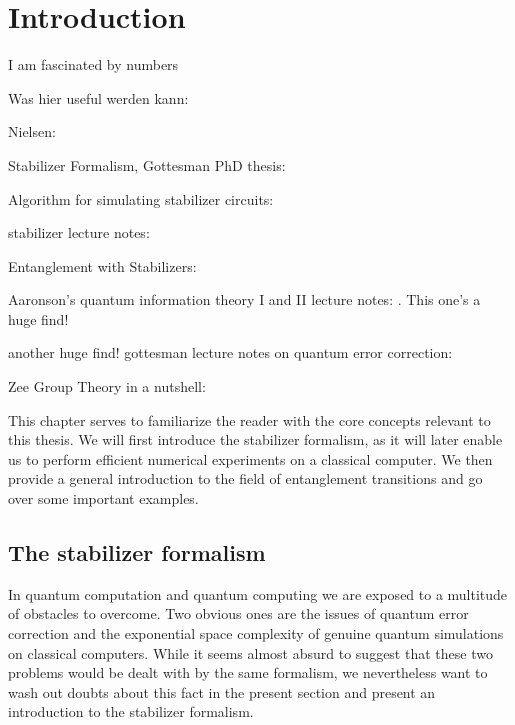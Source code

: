 \chapter{Introduction}
\label{ch:basics}
\epigraph{I am fascinated by numbers}{
\citeauthor{baron-cohenAutismSpectrumQuotientAQ2001}}

Was hier useful werden kann:

Nielsen: \cite{nielsenQuantumComputationQuantum2010}

Stabilizer Formalism, Gottesman PhD thesis: \cite{gottesmanStabilizerCodesQuantum1997}

Algorithm for simulating stabilizer circuits:
\cite{aaronsonImprovedSimulationStabilizer2004}

stabilizer lecture notes: \cite{arabLectureNotesQuantum2024}

Entanglement with Stabilizers: \cite{fattalEntanglementStabilizerFormalism2004}

Aaronson's quantum information theory I and II lecture notes:
\cite{aaronsonIntroductionQuantumInformation,aaronsonIntroductionQuantumInformationa}.
This one's a huge find!

another huge find! gottesman lecture notes on quantum error correction:
\cite{gottesmanSurvivingQuantumComputer2024}

Zee Group Theory in a nutshell: \cite{zeeGroupTheoryNutshell2016}

This chapter serves to familiarize the reader with the core concepts relevant
to this thesis. We will first introduce the stabilizer formalism, as it will
later enable us to perform efficient numerical experiments on a classical
computer. We then provide a general introduction to the field of entanglement
transitions and go over some important examples. 
\newpage
\section{The stabilizer formalism}\label{sec:stab-basics}
In quantum computation and quantum computing we are exposed to a multitude of
obstacles to overcome. Two obvious ones are the issues of quantum error
correction and the exponential space complexity of genuine quantum simulations
on classical computers. While it seems almost absurd to suggest that these two
problems would be dealt with by the same formalism, we nevertheless want to
wash out doubts about this fact in the present section and present an
introduction to the stabilizer formalism.

